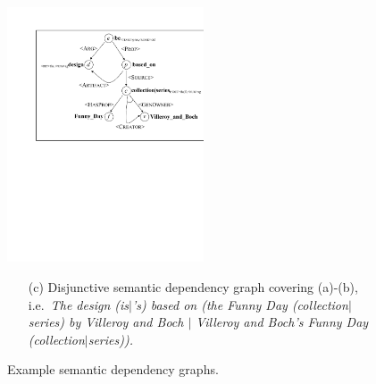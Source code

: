 \documentclass[11pt]{article}
\begin{document}
\begin{figure}
\begin{small}
\vspace{3mm}
\begin{center}
\includegraphics[width=0.52\textwidth]{ex1c} 
\end{center}
\begin{itemize}
\item[(c)] Disjunctive semantic dependency graph covering (a)-(b), i.e.\
\textit{The design (is$\mid$'s) based on 
(the Funny Day (collection$\mid$series) by Villeroy and Boch $\mid$
Villeroy and Boch's Funny Day (collection$\mid$series)).}
\end{itemize}
\end{small}

\caption{Example semantic dependency graphs.}
\label{fig:ex1}
\end{figure}
\end{document}
